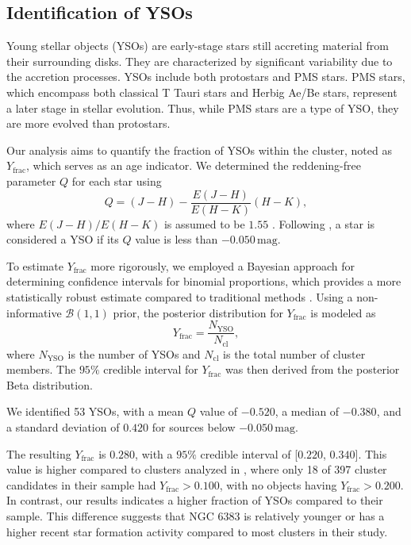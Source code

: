 \documentclass{aa}
\begin{document}
\subsection{Identification of YSOs}

Young stellar objects (YSOs) are early-stage stars still accreting material from their surrounding disks. They are characterized by significant variability due to the accretion processes. YSOs include both protostars and PMS stars. PMS stars, which encompass both classical T Tauri stars and Herbig Ae/Be stars, represent a later stage in stellar evolution. Thus, while PMS stars are a type of YSO, they are more evolved than protostars.

Our analysis aims to quantify the fraction of YSOs within the cluster, noted as $ Y_{\text{frac}} $, which serves as an age indicator. We determined the reddening-free parameter $ Q $ for each star using
\begin{equation}
	Q = (J - H) - \frac{E(J-H)}{E(H - K)} (H-K),
\end{equation}
where $ E(J-H)/E(H-K) $ is assumed to be $1.55$ \citep{1990ARA&A..28...37M}. Following \citet{2013MNRAS.436.1465B}, a star is considered a YSO if its $ Q $ value is less than $-0.050\,\mathrm{mag}$.

To estimate $ Y_{\text{frac}} $ more rigorously, we employed a Bayesian approach for determining confidence intervals for binomial proportions, which provides a more statistically robust estimate compared to traditional methods \citep{2011PASA...28..128C}. Using a non-informative $\mathcal{B}(1, 1)$ prior, the posterior distribution for $ Y_{\text{frac}} $ is modeled as
\begin{equation}
	Y_{\text{frac}} = \frac{N_{\text{YSO}}}{N_{\text{cl}}},
\end{equation}
where $ N_{\text{YSO}} $ is the number of YSOs and $ N_{\text{cl}} $ is the total number of cluster members. The $95\%$ credible interval for $ Y_{\text{frac}} $ was then derived from the posterior Beta distribution.

We identified 53 YSOs, with a mean $ Q $ value of $-0.520$, a median of $-0.380$, and a standard deviation of $0.420$ for sources below $-0.050\,\mathrm{mag}$.

The resulting $ Y_{\text{frac}} $ is $0.280$, with a $95\%$ credible interval of [$0.220$, $0.340$]. This value is higher compared to clusters analyzed in \citet{2013MNRAS.436.1465B}, where only 18 of 397 cluster candidates in their sample had $ Y_{\text{frac}} > 0.100 $, with no objects having $ Y_{\text{frac}} > 0.200 $. In contrast, our results indicates a higher fraction of YSOs compared to their sample. This difference suggests that NGC 6383 is relatively younger or has a higher recent star formation activity compared to most clusters in their study.
\end{document}
